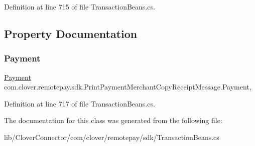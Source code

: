 Definition at line 715 of file Transaction\+Beans.\+cs.



\subsection{Property Documentation}
\mbox{\label{classcom_1_1clover_1_1remotepay_1_1sdk_1_1_print_payment_merchant_copy_receipt_message_a79d99fc5d0cbbd8da1e30eb9e6d34f3f}} 
\subsubsection{\texorpdfstring{Payment}{Payment}}
{\footnotesize\ttfamily \hyperlink{classcom_1_1clover_1_1sdk_1_1v3_1_1payments_1_1_payment}{Payment} com.\+clover.\+remotepay.\+sdk.\+Print\+Payment\+Merchant\+Copy\+Receipt\+Message.\+Payment\hspace{0.3cm}{\ttfamily [get]}, {\ttfamily [set]}}



Definition at line 717 of file Transaction\+Beans.\+cs.



The documentation for this class was generated from the following file\+:\begin{DoxyCompactItemize}
\item 
lib/\+Clover\+Connector/com/clover/remotepay/sdk/Transaction\+Beans.\+cs\end{DoxyCompactItemize}
